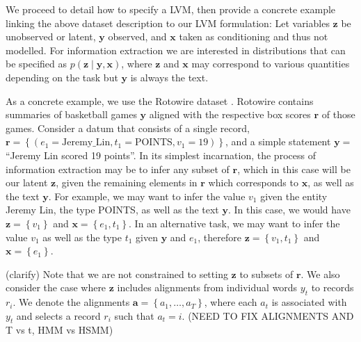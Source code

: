 \documentclass[11pt]{article}
\newcommand\set[1]{\left\{#1\right\}}
\newcommand{\ba}{\mathbf{a}}
\newcommand{\br}{\mathbf{r}}
\newcommand{\bx}{\mathbf{x}}
\newcommand{\by}{\mathbf{y}}
\newcommand{\bz}{\mathbf{z}}
\begin{document}
We proceed to detail how to specify a LVM,
then provide a concrete example linking the above dataset description to our LVM formulation:
Let variables $\bz$ be unobserved or latent, $\by$ observed, and $\bx$ taken as conditioning
and thus not modelled.
For information extraction we are interested in distributions
that can be specified as $p(\bz\mid\by,\bx)$,
where $\bz$ and $\bx$ may correspond to various quantities depending on the task
but $\by$ is always the text.

As a concrete example, we use the Rotowire dataset \citep{wiseman2017d2t}.
Rotowire contains summaries of basketball games $\by$ aligned with the respective
box scores $\br$ of those games.
Consider a datum that consists of a single record,
$\br = \set{(e_1 = \textrm{Jeremy\_Lin}, t_1 = \textrm{POINTS}, v_1 = 19)}$,
and a simple statement $\by = $``Jeremy Lin scored 19 points''.
In its simplest incarnation, the process of information extraction may be to infer any
subset of $\br$, which in this case will be our latent $\bz$, given the remaining elements in $\br$
which corresponds to $\bx$, as well as the text $\by$.
For example, we may want to infer the value $v_1$ given 
the entity Jeremy Lin, the type POINTS, as well as the text $\by$.
In this case, we would have $\bz = \set{v_1}$ and $\bx = \set{e_1,t_1}$.
In an alternative task, we may want to infer the value $v_1$ 
as well as the type $t_1$ given $\by$ and $e_1$, therefore $\bz = \set{v_1,t_1}$ and $\bx=\set{e_1}$.

(clarify)
Note that we are not constrained to setting $\bz$ to subsets of $\br$.
We also consider the case where $\bz$ includes alignments from individual words $y_t$
to records $r_i$. We denote the alignments $\ba = \set{a_1,\ldots,a_T}$,
where each $a_t$ is associated with $y_t$ and selects a record $r_i$ such that $a_t = i$.
(NEED TO FIX ALIGNMENTS AND T vs t, HMM vs HSMM)
\end{document}
